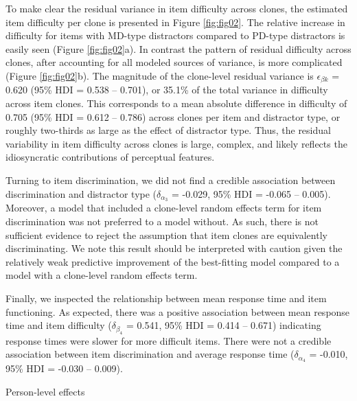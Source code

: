 \documentclass[a4paper,man,natbib]{apa6}
\makeatletter
\renewcommand{\subsubsection}{\@startsection{subsubsection}{3}
  {\z@}%
  {\b@level@two@skip}{\e@level@two@skip}%
  {\normalfont\normalsize\bfseries}}
\makeatother
\begin{document}
To make clear the residual variance in item difficulty across clones, the estimated item difficulty per clone is presented in Figure \ref{fig:fig02}. The relative increase in difficulty for items with MD-type distractors compared to PD-type distractors is easily seen (Figure \ref{fig:fig02}a). In contrast the pattern of residual difficulty across clones, after accounting for all modeled sources of variance, is more complicated (Figure \ref{fig:fig02}b). The magnitude of the clone-level residual variance is $\epsilon_{\beta k}$ = 0.620 (95\% HDI = 0.538 -- 0.701), or 35.1\% of the total variance in difficulty across item clones. This corresponds to a mean absolute difference in difficulty of 0.705 (95\% HDI = 0.612 -- 0.786) across clones per item and distractor type, or roughly two-thirds as large as the effect of distractor type. Thus, the residual variability in item difficulty across clones is large, complex, and likely reflects the idiosyncratic contributions of perceptual features. 

Turning to item discrimination, we did not find a credible association between discrimination and distractor type ($\delta_{\alpha_3}$ = -0.029, 95\% HDI = -0.065 -- 0.005). Moreover, a model that included a clone-level random effects term for item discrimination was not preferred to a model without. As such, there is not sufficient evidence to reject the assumption that item clones are equivalently discriminating. We note this result should be interpreted with caution given the relatively weak predictive improvement of the best-fitting model compared to a model with a clone-level random effects term.

Finally, we inspected the relationship between mean response time and item functioning. As expected, there was a positive association between mean response time and item difficulty ($\delta_{\beta_4}$ = 0.541, 95\% HDI = 0.414 -- 0.671) indicating response times were slower for more difficult items. There were not a credible association between item discrimination and average response time ($\delta_{\alpha_4}$ = -0.010, 95\% HDI = -0.030 -- 0.009).

\subsubsection{Person-level effects}
\end{document}
